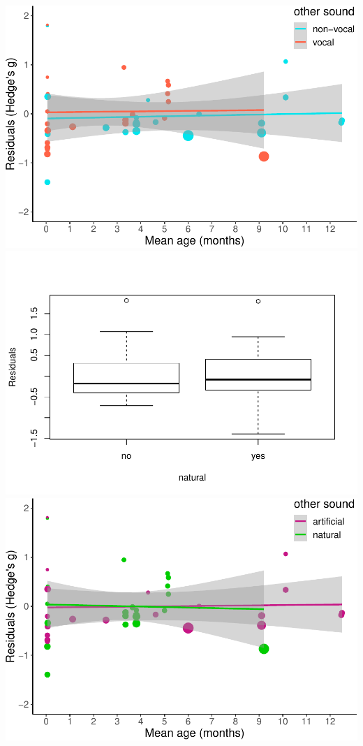 \documentclass[man]{apa6}
\begin{document}
\includegraphics{MA_speech_pref_files/figure-latex/residuals-1.pdf}
\includegraphics{MA_speech_pref_files/figure-latex/residuals-2.pdf}
\includegraphics{MA_speech_pref_files/figure-latex/residuals-3.pdf}
\end{document}
